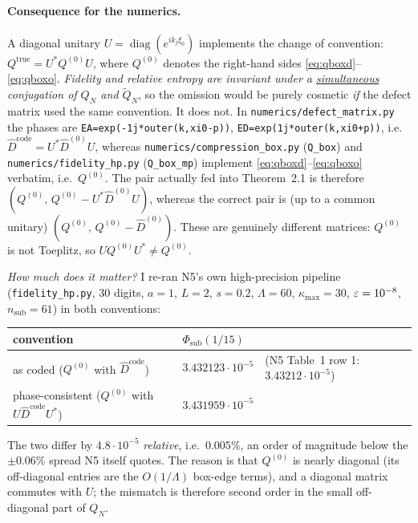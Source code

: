\documentclass[11pt]{article}
\begin{document}
\paragraph{Consequence for the numerics.}
A diagonal unitary $U=\operatorname{diag}(e^{ik_j\xi_0})$ implements the change of convention:
$Q^{\mathrm{true}}=U^*Q^{(0)}U$, where $Q^{(0)}$ denotes the right-hand sides
\eqref{eq:qboxd}--\eqref{eq:qboxo}.  \emph{Fidelity and relative entropy are invariant under a
\underline{simultaneous} conjugation of $Q_N$ and $\widetilde Q_N$}, so the omission would be
purely cosmetic \emph{if} the defect matrix used the same convention.  It does not.  In
\texttt{numerics/defect\_matrix.py} the phases are
\verb|EA=exp(-1j*outer(k,xi0-p))|, \verb|ED=exp(1j*outer(k,xi0+p))|, i.e.
$\widehat D^{\mathrm{code}}=U^*\widehat D^{(0)}U$, whereas
\texttt{numerics/compression\_box.py} (\verb|Q_box|) and \texttt{numerics/fidelity\_hp.py}
(\verb|Q_box_mp|) implement \eqref{eq:qboxd}--\eqref{eq:qboxo} verbatim, i.e.\ $Q^{(0)}$.
The pair actually fed into Theorem~2.1 is therefore
$(Q^{(0)},\,Q^{(0)}-U^*\widehat D^{(0)}U)$, whereas the correct pair is (up to a common unitary)
$(Q^{(0)},\,Q^{(0)}-\widehat D^{(0)})$.  These are genuinely different matrices: $Q^{(0)}$ is not
Toeplitz, so $UQ^{(0)}U^*\ne Q^{(0)}$.

\emph{How much does it matter?}  I re-ran N5's own high-precision pipeline
(\texttt{fidelity\_hp.py}, $30$ digits, $a=1$, $L=2$, $s=0.2$, $\Lambda=60$,
$\kappa_{\max}=30$, $\varepsilon=10^{-8}$, $n_{\mathrm{sub}}=61$) in both conventions:
\begin{center}\small
\begin{tabular}{lll}\toprule
convention & $\Phi_{\mathrm{sub}}(1/15)$ & \\\midrule
as coded ($Q^{(0)}$ with $\widehat D^{\mathrm{code}}$) & $3.432123\cdot10^{-5}$ & (N5 Table~1 row 1: $3.43212\cdot10^{-5}$)\\
phase-consistent ($Q^{(0)}$ with $U\widehat D^{\mathrm{code}}U^*$) & $3.431959\cdot10^{-5}$ & \\\bottomrule
\end{tabular}\end{center}
The two differ by $4.8\cdot10^{-5}$ \emph{relative}, i.e.\ $0.005\%$, an order of magnitude below
the $\pm0.06\%$ spread N5 itself quotes.  The reason is that $Q^{(0)}$ is nearly diagonal (its
off-diagonal entries are the $O(1/\Lambda)$ box-edge terms), and a diagonal matrix commutes with
$U$; the mismatch is therefore second order in the small off-diagonal part of $Q_N$.
\end{document}
